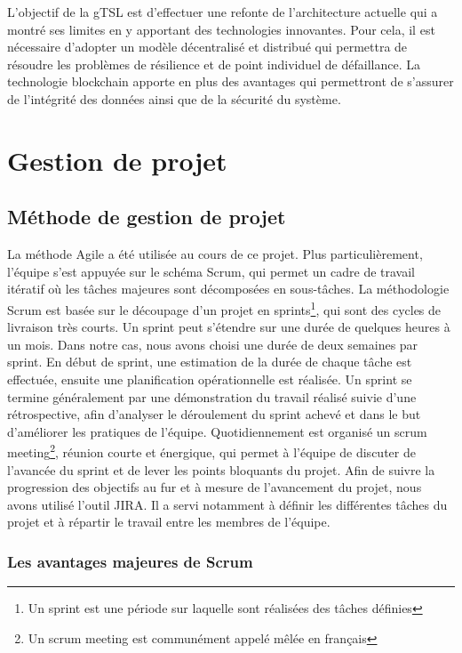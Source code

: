 \documentclass{tnreport}
\begin{document}
L'objectif de la gTSL est d'effectuer une refonte de l'architecture actuelle qui a montré ses limites en y apportant des technologies innovantes. Pour cela, il est nécessaire d'adopter un modèle décentralisé et distribué qui permettra de résoudre les problèmes de résilience et de point individuel de défaillance. La technologie blockchain apporte en plus des avantages qui permettront de s'assurer de l'intégrité des données ainsi que de la sécurité du système.

\section{Gestion de projet}

\subsection{Méthode de gestion de projet}

La méthode Agile a été utilisée au cours de ce projet. 
Plus particulièrement, l'équipe s'est appuyée sur le schéma Scrum, qui permet un cadre de travail itératif où les tâches majeures sont décomposées en sous-tâches.
La méthodologie Scrum est basée sur le découpage d'un projet en sprints\footnote{Un sprint est une période sur laquelle sont réalisées des tâches définies}, qui sont des cycles de livraison très courts.
Un sprint peut s'étendre sur une durée de quelques heures à un mois. 
Dans notre cas, nous avons choisi une durée de deux semaines par sprint.
En début de sprint, une estimation de la durée de chaque tâche est effectuée, ensuite une planification opérationnelle est réalisée.
Un sprint se termine généralement par une démonstration du travail réalisé suivie d'une rétrospective, afin d'analyser le déroulement du sprint achevé et dans le but d'améliorer les pratiques de l'équipe. 
Quotidiennement est organisé un scrum meeting\footnote{Un scrum meeting est communément appelé mêlée en français}, réunion courte et énergique, qui permet à l'équipe de discuter de l'avancée du sprint et de lever les points bloquants du projet.
Afin de suivre la progression des objectifs au fur et à mesure de l’avancement du projet, nous avons utilisé l'outil JIRA. Il a servi notamment à définir les différentes tâches du projet et à répartir le travail entre les membres de l’équipe.

\subsubsection{Les avantages majeures de Scrum}
\end{document}
